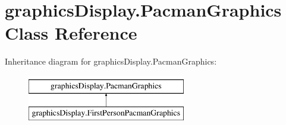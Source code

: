\hypertarget{classgraphics_display_1_1_pacman_graphics}{}\section{graphics\+Display.\+Pacman\+Graphics Class Reference}
\label{classgraphics_display_1_1_pacman_graphics}
Inheritance diagram for graphics\+Display.\+Pacman\+Graphics\+:\begin{figure}[H]
\begin{center}
\leavevmode
\includegraphics[height=2.000000cm]{classgraphics_display_1_1_pacman_graphics}
\end{center}
\end{figure}
